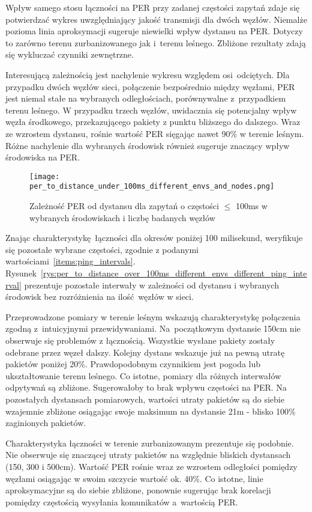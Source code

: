 Wpływ samego stosu łączności na PER przy zadanej częstości zapytań zdaje się potwierdzać wykres uwzględniający
jakość transmisji dla dwóch węzłów. Niemalże pozioma linia aproksymacji sugeruje niewielki wpływ dystansu na PER.
Dotyczy to zarówno terenu zurbanizowanego jak i~terenu leśnego. Zbliżone rezultaty zdają się wykluczać
czynniki zewnętrzne.

Interesującą zależnością jest nachylenie wykresu względem osi odciętych. Dla przypadku dwóch węzłów sieci,
połączenie bezpośrednio między węzłami, PER jest niemal stałe na wybranych odległościach, porównywalne
z~przypadkiem terenu leśnego. W przypadku trzech
węzłów, uwidacznia się potencjalny wpływ węzła środkowego, przekazującego pakiety z punktu bliższego do
dalszego. Wraz ze wzrostem dystansu, rośnie wartość PER sięgając nawet 90\% w terenie leśnym. Różne nachylenie
dla wybranych środowisk również sugeruje znaczący wpływ środowiska na PER.

\begin{figure}[!htb]
	\centering \texttt{[image: per\_to\_distance\_under\_100ms\_different\_envs\_and\_nodes.png]}
	\caption{Zależność \gls{PER} od dystansu dla zapytań o częstości $\leqslant$ 100ms w wybranych środowiskach i liczbę badanych węzłów}
	\label{rys:per_to_distance_under_100ms_different_envs_and_nodes}
\end{figure}

Znając charakterystykę łączności dla okresów poniżej 100 milisekund, weryfikuje się pozostałe wybrane częstości, zgodnie
z podanymi wartościami~\ref{items:ping_intervals}. Rysunek~\ref{rys:per_to_distance_over_100ms_different_envs_different_ping_interval}
prezentuje pozostałe interwały w zależności od dystansu i wybranych środowisk bez rozróżnienia na ilość węzłów w sieci.

Przeprowadzone pomiary w terenie leśnym wskazują charakterystykę połączenia zgodną z~intuicyjnymi przewidywaniami.
Na~początkowym dystansie 150cm nie obserwuje się problemów z łącznością. Wszystkie wysłane pakiety zostały
odebrane przez węzeł dalszy. Kolejny dystans wskazuje już na pewną utratę pakietów poniżej 20\%. Prawdopodobnym czynnikiem
jest pogoda lub ukształtowanie terenu leśnego. Co istotne, pomiary dla różnych interwałów odpytywań są zbliżone.
Sugerowałoby to brak wpływu częstości na \gls{PER}. Na pozostałych dystansach pomiarowych, wartości utraty pakietów
są do siebie wzajemnie zbliżone osiągając swoje maksimum na dystansie 21m - blisko 100\% zaginionych pakietów.

Charakterystyka łączności w terenie zurbanizowanym prezentuje się podobnie. Nie obserwuje się znaczącej utraty 
pakietów na względnie bliskich dystansach (150, 300 i 500cm). Wartość PER rośnie wraz ze wzrostem odległości
pomiędzy węzłami osiągając w swoim szczycie wartość ok. 40\%. Co istotne, linie aproksymacyjne są do siebie
zbliżone, ponownie sugerując brak korelacji pomiędzy częstością wysyłania komunikatów a~wartością PER.


